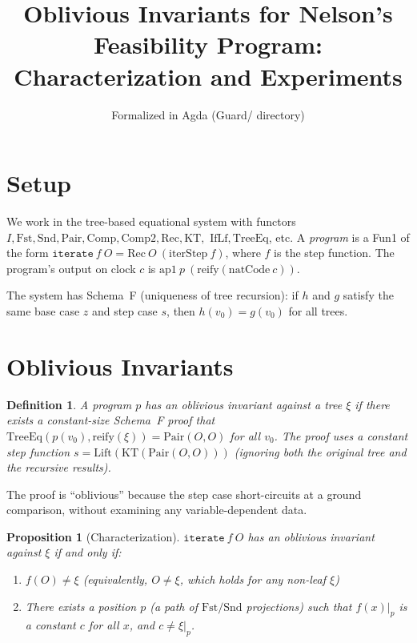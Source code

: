 \documentclass[11pt]{article}
\title{Oblivious Invariants for Nelson's Feasibility Program:\\Characterization and Experiments}
\author{Formalized in Agda (Guard/ directory)}
\date{}
\newtheorem{definition}[theorem]{Definition}
\newtheorem{proposition}[theorem]{Proposition}
\begin{document}
\maketitle

\section{Setup}

We work in the tree-based equational system with functors
$I, \mathrm{Fst}, \mathrm{Snd}, \mathrm{Pair}, \mathrm{Comp}, \mathrm{Comp2}, \mathrm{Rec}, \mathrm{KT},$
$\mathrm{IfLf}, \mathrm{TreeEq}$, etc.
A \emph{program} is a Fun1 of the form $\mathtt{iterate}\ f\ O = \mathrm{Rec}\ O\ (\mathrm{iterStep}\ f)$,
where $f$ is the step function. The program's output on clock $c$ is
$\mathrm{ap1}\ p\ (\mathrm{reify}(\mathrm{natCode}\ c))$.

The system has Schema~F (uniqueness of tree recursion): if $h$ and $g$ satisfy
the same base case $z$ and step case $s$, then $h(v_0) = g(v_0)$ for all trees.

\section{Oblivious Invariants}

\begin{definition}
A program $p$ has an \emph{oblivious invariant} against a tree $\xi$ if
there exists a constant-size Schema~F proof that
$\mathrm{TreeEq}(p(v_0), \mathrm{reify}(\xi)) = \mathrm{Pair}(O,O)$ for all $v_0$.
The proof uses a \emph{constant} step function $s = \mathrm{Lift}(\mathrm{KT}(\mathrm{Pair}(O,O)))$
(ignoring both the original tree and the recursive results).
\end{definition}

The proof is ``oblivious'' because the step case short-circuits at a ground
comparison, without examining any variable-dependent data.

\begin{proposition}[Characterization]
$\mathtt{iterate}\ f\ O$ has an oblivious invariant against $\xi$ if and only if:
\begin{enumerate}
\item[(a)] $f(O) \neq \xi$ (equivalently, $O \neq \xi$, which holds for any non-leaf $\xi$)
\item[(b)] There exists a position $p$ (a path of $\mathrm{Fst}/\mathrm{Snd}$ projections)
such that $f(x)|_p$ is a constant $c$ for all $x$, and $c \neq \xi|_p$.
\end{enumerate}
\end{proposition}
\end{document}
